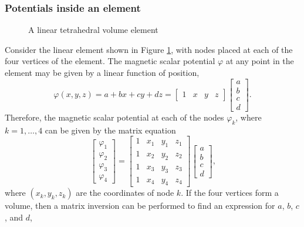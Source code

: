 \subsubsection*{Potentials inside an element}
\begin{figure}
    \centering
    \vspace{5cm}
    \caption{A linear tetrahedral volume element}
    \label{fig:tetElement}
\end{figure}
Consider the linear element shown in Figure \ref{fig:tetElement}, with nodes placed at each of the four vertices of the element. The magnetic scalar potential \(\varphi\) at any point in the element may be given by a linear function of position,
\begin{equation}\label{eqn:femLinEq}
    \varphi\left(x,y,z\right) = a + bx + cy + dz = \begin{bmatrix} 1 & x & y & z \end{bmatrix} \begin{bmatrix} a \\ b \\ c \\ d \end{bmatrix} \text{.}
\end{equation}
Therefore, the magnetic scalar potential at each of the nodes \(\varphi_k\), where \(k = 1,\dots,4\) can be given by the matrix equation
\begin{equation}
    \begin{bmatrix} \varphi_1 \\ \varphi_2 \\ \varphi_3 \\ \varphi_4 \end{bmatrix} = \begin{bmatrix} 1 & x_1 & y_1 & z_1 \\ 1 & x_2 & y_2 & z_2 \\ 1 & x_3 & y_3 & z_3 \\ 1 & x_4 & y_4 & z_4 \end{bmatrix} \begin{bmatrix} a \\ b \\ c \\ d \end{bmatrix} \text{,}
\end{equation}
where \(\left(x_k,y_k,z_k\right)\) are the coordinates of node \(k\). If the four vertices form a volume, then a matrix inversion can be performed to find an expression for \(a\), \(b\), \(c\), and \(d\),
